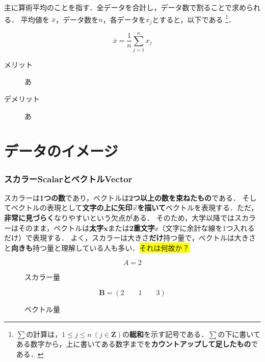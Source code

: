 \documentclass[a4paper,11pt]{ltjsarticle}
\newcommand{\idx}[1]{#1\index{#1}}
\begin{document}
主に算術平均のことを指す．全データを合計し，データ数で割ることで求められる．
平均値を $\bar{x}$，データ数を$n$，各データを$x_j$とすると，以下である
\footnote{$\displaystyle{\sum}$の計算は，$1 \leq j \leq n\ (j \in \bm{Z})$の\textbf{総和}を示す記号である．$\displaystyle{\sum}$の下に書いてある数字から，上に書いてある数字までを\textbf{カウントアップして足したもの}である．}．

\begin{equation}
  \bar{x} = \frac{1}{n} \sum_{j=1}^n x_j
\end{equation}

\begin{description}
  \item[メリット] あ
  \item[デメリット] あ
\end{description}

\clearpage

\part{データのイメージ}
\label{part: deta}

\section{スカラーScalarとベクトルVector}
\label{sec: sca-vec}

\idx{スカラー}は\textbf{1つの数}であり，\idx{ベクトル}は\textbf{2つ以上の数を束ねたもの}である．
そしてベクトルの表現として\textbf{文字の上に矢印$\vec{x}$を描いて}ベクトルを表現する．ただ，\textbf{非常に見づらく}なりやすいという欠点がある．
そのため，大学以降ではスカラーはそのまま，ベクトルは\textbf{太字}$\bm{x}$または\textbf{2重文字}$\mathbb{x}$（文字に余計な線を1つ入れるだけ）で表現する．
よく，スカラーは大きさ\textbf{だけ}持つ量で，ベクトルは大きさと\textbf{向きも}持つ量と理解している人も多い．\colorbox{yellow}{それは何故か？}

\begin{figure}[htbp]
\centering
\begin{minipage}[b]{0.49\columnwidth}
  \centering
  \begin{equation*}
    A = 2
  \end{equation*}
  \caption{スカラー量}
  \label{eq: sca-quantity}
\end{minipage}
\begin{minipage}[b]{0.49\columnwidth}
  \centering
  \begin{equation*}
    \bm{B} = (2 \qquad 1 \qquad 3)
  \end{equation*}
  \caption{ベクトル量}
  \label{eq: vec-quantity}
\end{minipage}
\end{figure}
\end{document}
